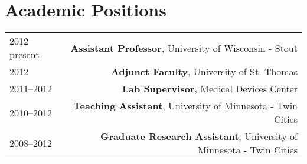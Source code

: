 \section*{Academic Positions}
\begin{tabular}{L!{\VRule}R}
2012--present&{\bf Assistant Professor}, University of Wisconsin - Stout\\
2012&{\bf Adjunct Faculty}, University of St. Thomas\\
2011--2012&{\bf Lab Supervisor}, Medical Devices Center\\
2010--2012&{\bf Teaching Assistant}, University of Minnesota - Twin Cities\\
2008--2012&{\bf Graduate Research Assistant}, University of Minnesota - Twin Cities\\
\end{tabular}